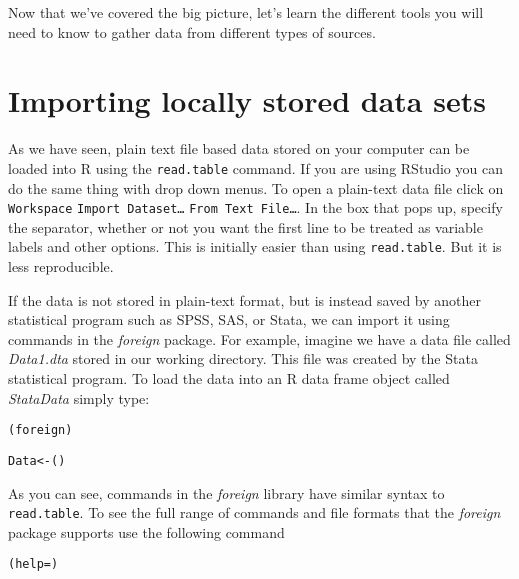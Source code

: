 Now that we've covered the big picture, let's learn the different tools you will need to know to gather data from different types of sources.

\section{Importing locally stored data sets}

As we have seen, plain text file based data stored on your computer can be loaded into R using the \texttt{read.table} command. If you are using RStudio you can do the same thing with drop down menus. To open a plain-text data file click on \texttt{Workspace} \textrightarrow\: \texttt{Import Dataset\ldots} \textrightarrow\: \texttt{From Text File\ldots}. In the box that pops up, specify the separator, whether or not you want the first line to be treated as variable labels and other options. This is initially easier than using \texttt{read.table}. But it is less reproducible.

If the data is not stored in plain-text format, but is instead saved by another statistical program such as SPSS, SAS, or Stata, we can import it using commands in the \emph{foreign} package. For example, imagine we have a data file called \emph{Data1.dta} stored in our working directory. This file was created by the Stata statistical program. To load the data into an R data frame object called \emph{StataData} simply type:

\begin{knitrout}
\color{fgcolor}\begin{kframe}
\begin{alltt}
(foreign)

Data <- ()
\end{alltt}
\end{kframe}
\end{knitrout}


As you can see, commands in the \emph{foreign} library have similar syntax to \texttt{read.table}. To see the full range of commands and file formats that the \emph{foreign} package supports use the following command

\begin{knitrout}
\color{fgcolor}\begin{kframe}
\begin{alltt}
(help = )
\end{alltt}
\end{kframe}
\end{knitrout}


